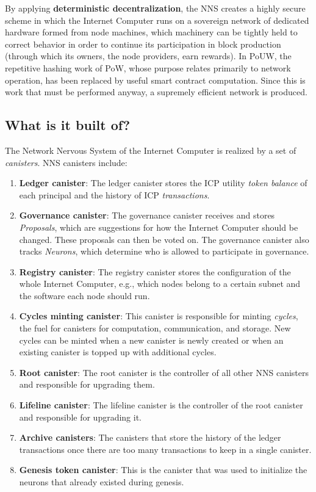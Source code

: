By applying \textbf{deterministic decentralization}, the NNS creates a highly secure scheme in which the Internet Computer runs on a sovereign network of dedicated hardware formed from node machines, which machinery can be tightly held to correct behavior in order to continue its participation in block production (through which its owners, the node providers, earn rewards). In PoUW, the repetitive hashing work of PoW, whose purpose relates primarily to network operation, has been replaced by useful smart contract computation. Since this is work that must be performed anyway, a supremely efficient network is produced.

\subsection{What is it built of?}

The Network Nervous System of the Internet Computer is realized by a set of \textit{canisters}. NNS canisters include:

\begin{enumerate}
  \item \textbf{Ledger canister}: The ledger canister stores the ICP utility \textit{token balance} of each principal and the history of ICP \textit{transactions}.
  \item \textbf{Governance canister}: The governance canister receives and stores \textit{Proposals}, which are suggestions for how the Internet Computer should be changed. These proposals can then be voted on. The governance canister also tracks \textit{Neurons}, which determine who is allowed to participate in governance.
  \item \textbf{Registry canister}: The registry canister stores the configuration of the whole Internet Computer, e.g., which nodes belong to a certain subnet and the software each node should run.
  \item \textbf{Cycles minting canister}: This canister is responsible for minting \textit{cycles}, the fuel for canisters for computation, communication, and storage. New cycles can be minted when a new canister is newly created or when an existing canister is topped up with additional cycles.
  \item \textbf{Root canister}: The root canister is the controller of all other NNS canisters and responsible for upgrading them.
  \item \textbf{Lifeline canister}: The lifeline canister is the controller of the root canister and responsible for upgrading it.
  \item \textbf{Archive canisters}: The canisters that store the history of the ledger transactions once there are too many transactions to keep in a single canister.
  \item \textbf{Genesis token canister}: This is the canister that was used to initialize the neurons that already existed during genesis.
\end{enumerate}

